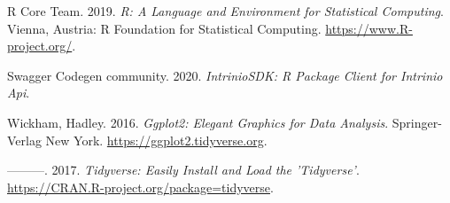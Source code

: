 \documentclass[
]{article}
\newlength{\cslhangindent}
\newenvironment{cslreferences}%
  {\setlength{\parindent}{0pt}%
  \everypar{\setlength{\hangindent}{\cslhangindent}}\ignorespaces}%
  {\par}
\begin{document}
\hypertarget{refs}{}
\begin{cslreferences}
\leavevmode\hypertarget{ref-R}{}%
R Core Team. 2019. \emph{R: A Language and Environment for Statistical
Computing}. Vienna, Austria: R Foundation for Statistical Computing.
\url{https://www.R-project.org/}.

\leavevmode\hypertarget{ref-intrinio}{}%
Swagger Codegen community. 2020. \emph{IntrinioSDK: R Package Client for
Intrinio Api}.

\leavevmode\hypertarget{ref-ggplot}{}%
Wickham, Hadley. 2016. \emph{Ggplot2: Elegant Graphics for Data
Analysis}. Springer-Verlag New York.
\url{https://ggplot2.tidyverse.org}.

\leavevmode\hypertarget{ref-tidyverse}{}%
---------. 2017. \emph{Tidyverse: Easily Install and Load the
'Tidyverse'}. \url{https://CRAN.R-project.org/package=tidyverse}.
\end{cslreferences}
\end{document}
